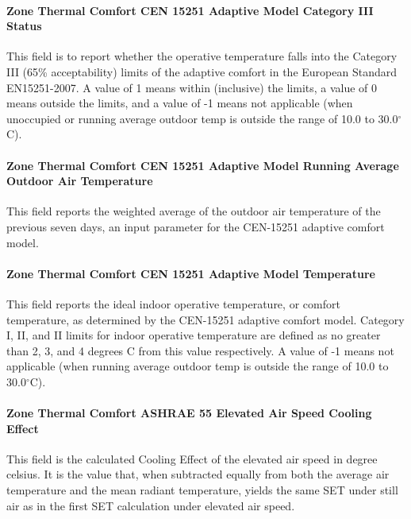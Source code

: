 \paragraph{Zone Thermal Comfort CEN 15251 Adaptive Model Category III Status}\label{zone-thermal-comfort-cen-15251-adaptive-model-category-iii-status}

This field is to report whether the operative temperature falls into the Category III (65\% acceptability) limits of the adaptive comfort in the European Standard EN15251-2007. A value of 1 means within (inclusive) the limits, a value of 0 means outside the limits, and a value of -1 means not applicable (when unoccupied or running average outdoor temp is outside the range of 10.0 to 30.0$^\circ$C).

\paragraph{Zone Thermal Comfort CEN 15251 Adaptive Model Running Average Outdoor Air Temperature}\label{zone-thermal-comfort-cen-15251-adaptive-model-running-average-outdoor-air-temperature}

This field reports the weighted average of the outdoor air temperature of the previous seven days, an input parameter for the CEN-15251 adaptive comfort model.

\paragraph{Zone Thermal Comfort CEN 15251 Adaptive Model Temperature}\label{zone-thermal-comfort-cen-15251-adaptive-model-temperature}

This field reports the ideal indoor operative temperature, or comfort temperature, as determined by the CEN-15251 adaptive comfort model. Category I, II, and II limits for indoor operative temperature are defined as no greater than 2, 3, and 4 degrees C from this value respectively. A value of -1 means not applicable (when running average outdoor temp is outside the range of 10.0 to 30.0$^\circ$C).

\paragraph{Zone Thermal Comfort ASHRAE 55 Elevated Air Speed Cooling Effect}\label{zone-thermal-comfort-ashrae55-elevated-air-speed-cooling-effect}

This field is the calculated Cooling Effect of the elevated air speed in degree celsius. It is the value that, when subtracted equally from both the average air temperature and the mean radiant temperature, yields the same SET under still air as in the first SET calculation under elevated air speed.


